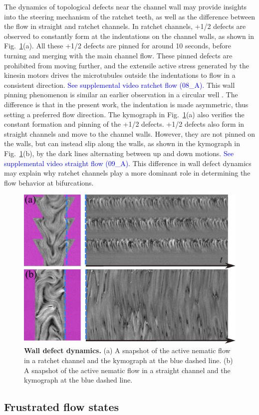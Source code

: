 \documentclass[%
10pt,
superscriptaddress,
twocolumn,
 amsmath,amssymb,
 aps,prx,
]{revtex4-2}
\newcommand{\blue}[1]{\textcolor{blue}{#1}}
\begin{document}
The dynamics of topological defects near the channel wall may provide insights into the steering mechanism of the ratchet teeth, as well as the difference between the flow in straight and ratchet channels.
In ratchet channels, +1/2 defects are observed to constantly form at the indentations on the channel walls, as shown in Fig.~\ref{fig:kymograph}(a). 
All these +1/2 defects are pinned for around 10 seconds, before turning and merging with the main channel flow. 
These pinned defects are prohibited from moving further, and the extensile active stress generated by the kinesin motors drives the microtubules outside the indentations to flow in a consistent direction.
\blue{See supplemental video ratchet flow (08\_A).}
This wall pinning phenomenon is similar an earlier observation in a circular well \cite{Hardouin2022}.
The difference is that in the present work, the indentation is made asymmetric, thus setting a preferred flow direction.
The kymograph in Fig.~\ref{fig:kymograph}(a) also verifies the constant formation and pinning of the +1/2 defects.
+1/2 defects also form in straight channels and move to the channel walls. 
However, they are not pinned on the walls, but can instead slip along the walls, as shown in the kymograph in Fig.~\ref{fig:kymograph}(b), by the dark lines alternating between up and down motions.
\blue{See supplemental video straight flow (09\_A).}
This difference in wall defect dynamics may explain why ratchet channels play a more dominant role in determining the flow behavior at bifurcations.

\begin{figure}[htb]
    \includegraphics[width=.45\textwidth]{kymograph}
    \caption{
    \textbf{Wall defect dynamics.}
    (a) A snapshot of the active nematic flow in a ratchet channel and the kymograph at the blue dashed line. 
    (b) A snapshot of the active nematic flow in a straight channel and the kymograph at the blue dashed line.
    }
    \label{fig:kymograph}
\end{figure}

\subsection{Frustrated flow states}
\end{document}
